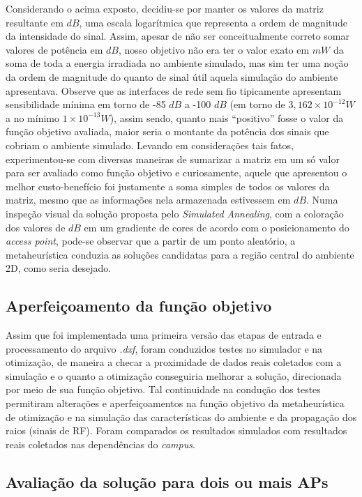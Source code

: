 \documentclass[
	12pt,				%
	twoside,			%
	a4paper,			%
	english,			%
	french,				%
	spanish,			%
	brazil				%
	]{abntex2}
\begin{document}
Considerando o acima exposto, decidiu-se por manter os valores da matriz
resultante em \(dB\), uma escala logarítmica que representa a ordem de
magnitude da intensidade do sinal. Assim, apesar de não ser
conceitualmente correto somar valores de potência em \(dB\), nosso
objetivo não era ter o valor exato em \(mW\) da soma de toda a energia
irradiada no ambiente simulado, mas sim ter uma noção da ordem de
magnitude do quanto de sinal útil aquela simulação do ambiente
apresentava. Observe que as interfaces de rede sem fio tipicamente
apresentam sensibilidade mínima em torno de -85 \(dB\) a -100 \(dB\) (em
torno de \(3,162\times10^{-12} W\) a no mínimo \(1\times10^{-13} W\)),
assim sendo, quanto mais ``positivo'' fosse o valor da função objetivo
avaliada, maior seria o montante da potência dos sinais que cobriam o
ambiente simulado. Levando em considerações tais fatos, experimentou-se
com diversas maneiras de sumarizar a matriz em um só valor para ser
avaliado como função objetivo e curiosamente, aquele que apresentou o
melhor custo-benefício foi justamente a soma simples de todos os valores
da matriz, mesmo que as informações nela armazenada estivessem em
\(dB\). Numa inspeção visual da solução proposta pelo \emph{Simulated
Annealing}, com a coloração dos valores de \(dB\) em um gradiente de
cores de acordo com o posicionamento do \emph{access point}, pode-se
observar que a partir de um ponto aleatório, a metaheurística conduzia
as soluções candidatas para a região central do ambiente 2D, como seria
desejado.

\subsection{Aperfeiçoamento da função
objetivo}\label{aperfeiuxe7oamento-da-funuxe7uxe3o-objetivo}

Assim que foi implementada uma primeira versão das etapas de entrada e
processamento do arquivo \emph{.dxf}, foram conduzidos testes no
simulador e na otimização, de maneira a checar a proximidade de dados
reais coletados com a simulação e o quanto a otimização conseguiria
melhorar a solução, direcionada por meio de sua função objetivo. Tal
continuidade na condução dos testes permitiram alterações e
aperfeiçoamentos na função objetivo da metaheurística de otimização e na
simulação das características do ambiente e da propagação dos raios
(sinais de RF). Foram comparados os resultados simulados com resultados
reais coletados nas dependências do \emph{campus}.

\subsection{Avaliação da solução para dois ou mais
APs}\label{sec:avalia_dois_ou_mais}
\end{document}
